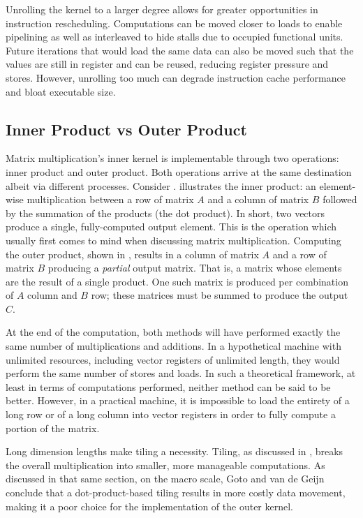 \documentclass[\main/thesis.tex]{subfiles}
\begin{document}
Unrolling the kernel to a larger degree allows for greater opportunities in instruction rescheduling.
Computations can be moved closer to loads to enable pipelining as well as interleaved to hide stalls due to occupied functional units.
Future iterations that would load the same data can also be moved such that the values are still in register and can be reused, reducing register pressure and stores.
However, unrolling too much can degrade instruction cache performance and bloat executable size.

\subsection{Inner Product vs Outer Product}
\label{sec:productsVs}
Matrix multiplication's inner kernel is implementable through two operations: inner product and outer product.
Both operations arrive at the same destination albeit via different processes.
Consider .
 illustrates the inner product: an element-wise multiplication between a row of matrix $A$ and a column of matrix $B$ followed by the summation of the products (\ie the dot product).
In short, two vectors produce a single, fully-computed output element.
This is the operation which usually first comes to mind when discussing matrix multiplication.
Computing the outer product, shown in , results in a column of matrix $A$ and a row of matrix $B$ producing a \emph{partial} output matrix.
That is, a matrix whose elements are the result of a single product.
One such matrix is produced per combination of $A$ column and $B$ row; these matrices must be summed to produce the output $C$.

At the end of the computation, both methods will have performed exactly the same number of multiplications and additions.
In a hypothetical machine with unlimited resources, including vector registers of unlimited length, they would perform the same number of stores and loads.
In such a theoretical framework, at least in terms of computations performed, neither method can be said to be better.
However, in a practical machine, it is impossible to load the entirety of a long row or of a long column into vector registers in order to fully compute a portion of the matrix.

Long dimension lengths make tiling a necessity.
Tiling, as discussed in , breaks the overall multiplication into smaller, more manageable computations.
As discussed in that same section, on the macro scale, Goto and van de Geijn conclude that a dot-product-based tiling results in more costly data movement, making it a poor choice for the implementation of the outer kernel.
\end{document}
